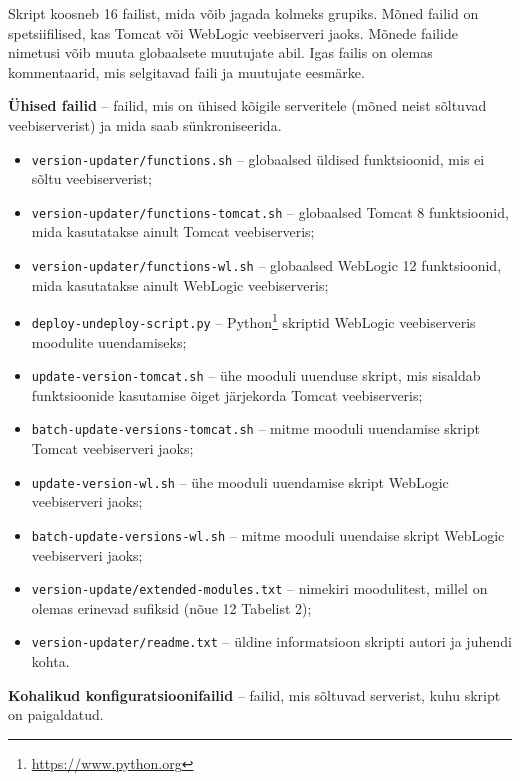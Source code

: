 \documentclass[12pt]{article}
\newcommand{\code}[1]{\texttt{#1}}
\begin{document}
  Skript koosneb 16 failist, mida võib jagada kolmeks grupiks. Mõned failid on spetsiifilised, kas Tomcat või WebLogic veebiserveri jaoks. Mõnede failide nimetusi võib muuta globaalsete muutujate abil. Igas failis on olemas kommentaarid, mis selgitavad faili ja muutujate eesmärke.

  \textbf{Ühised failid} \--- failid, mis on ühised kõigile serveritele (mõned neist sõltuvad veebiserverist) ja mida saab sünkroniseerida.
  
  \begin{itemize}
    \item \code{version-updater/functions.sh} \--- globaalsed üldised funktsioonid, mis ei sõltu veebiserverist;
    \item \code{version-updater/functions-tomcat.sh} \--- globaalsed Tomcat 8 funktsioonid, mida kasutatakse ainult Tomcat veebiserveris;
    \item \code{version-updater/functions-wl.sh} \--- globaalsed WebLogic 12 funktsioonid, mida kasutatakse ainult WebLogic veebiserveris;
    \item \code{deploy-undeploy-script.py} \--- Python\footnote{\url{https://www.python.org}} skriptid WebLogic veebiserveris moodulite uuendamiseks;
    \item \code{update-version-tomcat.sh} \--- ühe mooduli uuenduse skript, mis sisaldab funktsioonide kasutamise õiget järjekorda Tomcat veebiserveris;
    \item \code{batch-update-versions-tomcat.sh} \--- mitme mooduli uuendamise skript Tomcat veebiserveri jaoks;
    \item \code{update-version-wl.sh} \--- ühe mooduli uuendamise skript WebLogic veebiserveri jaoks;
    \item \code{batch-update-versions-wl.sh} \--- mitme mooduli uuendaise skript WebLogic veebiserveri jaoks;
    \item \code{version-update/extended-modules.txt} \--- nimekiri moodulitest, millel on olemas erinevad sufiksid (nõue 12 Tabelist 2);
    \item \code{version-updater/readme.txt} \--- üldine informatsioon skripti autori ja juhendi kohta.
  \end{itemize}
  
  \textbf{Kohalikud konfiguratsioonifailid} \--- failid, mis sõltuvad serverist, kuhu skript on paigaldatud.
  
\end{document}
